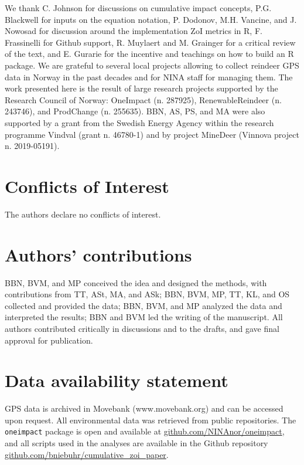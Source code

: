 \documentclass[titlepage]{article}
\begin{document}
We thank C. Johnson for discussions on cumulative impact concepts, P.G. Blackwell for inputs on the equation notation, P. Dodonov, M.H. Vancine, and J. Nowosad for discussion around the implementation ZoI metrics in R, F. Frassinelli for Github support, R. Muylaert and M. Grainger for a critical review of the text, and E. Gurarie for the incentive and teachings on how to build an R package. We are grateful to several local projects allowing to collect reindeer GPS data in Norway in the past decades and for NINA staff for managing them. The work presented here is the result of large research projects supported by the Research Council of Norway: OneImpact (n. 287925), RenewableReindeer (n. 243746), and ProdChange (n. 255635). BBN, AS, PS, and MA were also supported by a grant from the Swedish Energy Agency within the research programme Vindval (grant n. 46780-1) and by project MineDeer (Vinnova project n. 2019-05191).

\section*{Conflicts of Interest}

The authors declare no conflicts of interest.

\section*{Authors’ contributions}

BBN, BVM, and MP conceived the idea and designed the methods, with contributions from TT, ASt, MA, and ASk; BBN, BVM, MP, TT, KL, and OS collected and provided the data; BBN, BVM, and MP analyzed the data and interpreted the results; BBN and BVM led the writing of the manuscript. All authors contributed critically in discussions and to the drafts, and gave final approval for publication.

\section*{Data availability statement}

GPS data is archived in Movebank (www.movebank.org) and can be accessed upon request. All environmental data was retrieved from public repositories. The \verb|oneimpact| package is open and available at \url{github.com/NINAnor/oneimpact}, and all scripts used in the analyses are available in the Github repository \url{github.com/bniebuhr/cumulative_zoi_paper}.
\end{document}
